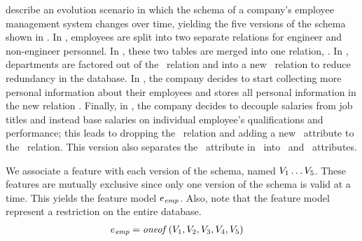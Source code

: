 \citet{prima08Moon} describe an evolution scenario in which the schema of a
company's employee management system changes over time, yielding the five
versions of the schema shown in .
%
In \vOne, employees are split into two separate relations for
engineer and non-engineer personnel.
%
In \vTwo, these two tables are merged into one relation, \empacct.
%
In \vThree, departments are factored out of the \empacct\ relation and
into a new \dept\ relation to reduce redundancy in the database.
%
In \vFour, the company decides to start collecting more personal
information about their employees and stores all personal information in the
new relation \empbio.
%
Finally, in \vFive, the company decides to decouple salaries from
job titles and instead base salaries on individual employee's qualifications
and performance; this leads to dropping the \job\ relation and adding a new
\salary\ attribute to the \empacct\ relation. This version also separates the
\name\ attribute in \empbio\ into \fname\ and \lname\ attributes.


We associate a feature with each version of the schema, named 
$\vOne\ldots\vFive$.
%
These features are mutually exclusive since only one version of the
schema is valid at a time. This yields the  feature model
$\dimMeta_\employee$.
%
 Also, note that the feature model represent a restriction on the entire
 database.
%
\begin{align*}
\dimMeta_\employee
  &=   \oneof {\vOne, \vTwo, \vThree, \vFour, \vFive}
%  
\end{align*}



